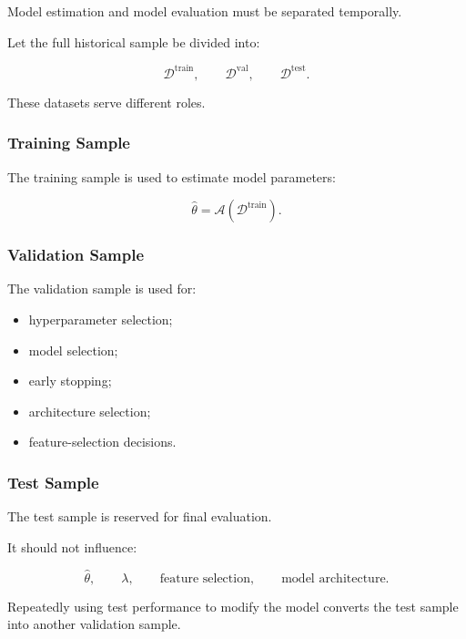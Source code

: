 \documentclass[11pt,a4paper]{article}
\begin{document}
Model estimation and model evaluation must be separated temporally.

Let the full historical sample be divided into:

\begin{equation}
\boxed{
\mathcal{D}^{\mathrm{train}},
\qquad
\mathcal{D}^{\mathrm{val}},
\qquad
\mathcal{D}^{\mathrm{test}}.
}
\end{equation}

These datasets serve different roles.


\subsubsection{Training Sample}

The training sample is used to estimate model parameters:

\begin{equation}
\widehat{\theta}
=
\mathcal{A}
\left(
\mathcal{D}^{\mathrm{train}}
\right).
\end{equation}


\subsubsection{Validation Sample}

The validation sample is used for:

\begin{itemize}
    \item hyperparameter selection;
    \item model selection;
    \item early stopping;
    \item architecture selection;
    \item feature-selection decisions.
\end{itemize}


\subsubsection{Test Sample}

The test sample is reserved for final evaluation.

It should not influence:

\begin{equation}
\widehat{\theta},
\qquad
\lambda,
\qquad
\text{feature selection},
\qquad
\text{model architecture}.
\end{equation}

Repeatedly using test performance to modify the model converts the test sample
into another validation sample.
\end{document}
